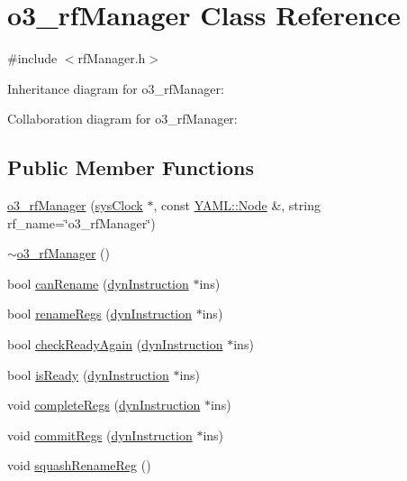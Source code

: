 \hypertarget{classo3__rfManager}{
\section{o3\_\-rfManager Class Reference}
\label{classo3__rfManager}
}


{\ttfamily \#include $<$rfManager.h$>$}



Inheritance diagram for o3\_\-rfManager:


Collaboration diagram for o3\_\-rfManager:
\subsection*{Public Member Functions}
\begin{DoxyCompactItemize}
\item 
\hyperlink{classo3__rfManager_aeacfb1db7844c9f204b5b75ce38d671d}{o3\_\-rfManager} (\hyperlink{classsysClock}{sysClock} $\ast$, const \hyperlink{classYAML_1_1Node}{YAML::Node} \&, string rf\_\-name=\char`\"{}o3\_\-rfManager\char`\"{})
\item 
\hyperlink{classo3__rfManager_a42a66fc34794ca6c7209f743557a2b3a}{$\sim$o3\_\-rfManager} ()
\item 
bool \hyperlink{classo3__rfManager_a023f3671f90123fe8749ff13606f273c}{canRename} (\hyperlink{classdynInstruction}{dynInstruction} $\ast$ins)
\item 
bool \hyperlink{classo3__rfManager_a702dcade81b3d2ccba4bae0ef8d7de30}{renameRegs} (\hyperlink{classdynInstruction}{dynInstruction} $\ast$ins)
\item 
bool \hyperlink{classo3__rfManager_a785b7804c89faffdaee23e25c2cc3568}{checkReadyAgain} (\hyperlink{classdynInstruction}{dynInstruction} $\ast$ins)
\item 
bool \hyperlink{classo3__rfManager_a9b85902c553b147228d0bb3b57280ca7}{isReady} (\hyperlink{classdynInstruction}{dynInstruction} $\ast$ins)
\item 
void \hyperlink{classo3__rfManager_a06b8854ab37feb6b44166a8565dc447a}{completeRegs} (\hyperlink{classdynInstruction}{dynInstruction} $\ast$ins)
\item 
void \hyperlink{classo3__rfManager_a7d3aa6c1316bac1153b24b7764d301fb}{commitRegs} (\hyperlink{classdynInstruction}{dynInstruction} $\ast$ins)
\item 
void \hyperlink{classo3__rfManager_ac8199decc9c7a881b2099a68711cced7}{squashRenameReg} ()
\item 

\end{DoxyCompactItemize}
